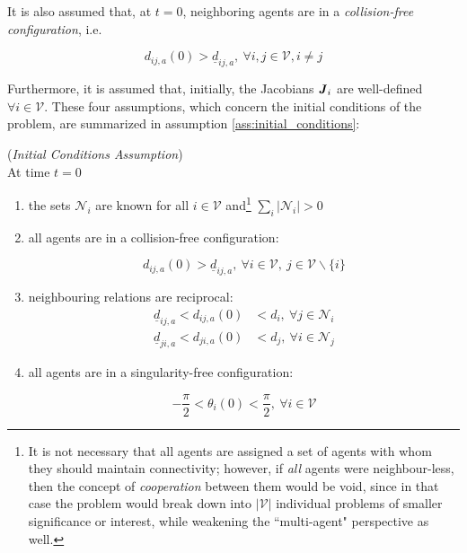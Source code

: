 It is also assumed that, at $t=0$, neighboring agents are in a
\textit{collision-free configuration}, i.e.

\begin{equation}
   d_{ij,a}(0) > \underline{d}_{ij, a},\ \forall i,j \in \mathcal{V}, i \neq j
\label{eq:initially_coll_free}
\end{equation}

Furthermore, it is assumed that, initially, the Jacobians $\bm{\mathit{J}}_i$ are
well-defined $\forall i \in \mathcal{V}$. These four assumptions, which concern
the initial conditions of the problem, are summarized in assumption
\ref{ass:initial_conditions}:

\begin{gg_box}
\begin{assumption}(\textit{Initial Conditions Assumption})\\

  At time $t = 0$

  \begin{enumerate}

    \item the sets $\mathcal{N}_i$ are known for all $i \in \mathcal{V}$
      and\footnote{It is not necessary that
      all agents are assigned a set of agents with whom they should maintain
      connectivity; however, if \textit{all} agents were neighbour-less,
      then the concept of \textit{cooperation} between them would be void,
      since in that case the problem would break down into $|\mathcal{V}|$
      individual problems of smaller significance or interest, while
      weakening the ``multi-agent" perspective as well.}
      $\sum\limits_i |\mathcal{N}_i| > 0$

    \item all agents are in a collision-free configuration:

      $$ d_{ij,a}(0) > \underline{d}_{ij,a},\ \forall i \in \mathcal{V},\ j \in \mathcal{V}\backslash \{i\}$$

    \item neighbouring relations are reciprocal:
      \begin{align}
        \underline{d}_{ij,a} < d_{ij,a}(0) &< d_i,\ \forall j \in \mathcal{N}_i \\
        \underline{d}_{ji,a} < d_{ji,a}(0) &< d_j,\ \forall i \in \mathcal{N}_j
      \end{align}

    \item all agents are in a singularity-free configuration:

      $$ -\frac{\pi}{2} < \theta_i(0) < \frac{\pi}{2},\ \forall i \in \mathcal{V}$$

  \end{enumerate}
  \label{ass:initial_conditions}
\end{assumption}
\end{gg_box}


